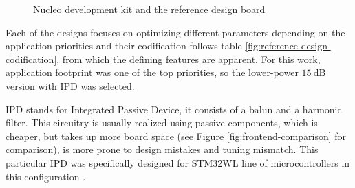 \begin{figure}
    \centering
    \caption{\label{fig:nucleo-and-reference} Nucleo development kit and the reference design board}
\end{figure}

Each of the designs focuses on optimizing different parameters depending on the application priorities and their codification follows table \ref{fig:reference-design-codification}, from which the defining features are apparent. For this work, application footprint was one of the top priorities, so the lower-power $15~\mathrm{dB}$ version with IPD was selected.

IPD stands for Integrated Passive Device, it consists of a balun and a harmonic filter. This circuitry is usually realized using passive components, which is cheaper, but takes up more board space (see Figure \ref{fig:frontend-comparison} for comparison), is more prone to design mistakes and tuning mismatch. This particular IPD was specifically designed for STM32WL line of microcontrollers in this configuration \cite{stmicroelectronics_balfhb-wl-05d3_2024}.

